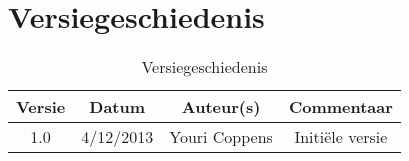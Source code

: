 \chapter{Versiegeschiedenis}

\begin{table}[htbp]
	\centering
	\begin{tabular} {|c|c|c|c|}
	    \hline
		\textbf{Versie} & \textbf{Datum} 	& \textbf{Auteur(s)} & \textbf{Commentaar} \\
		\hline
		1.0	& 4/12/2013	& Youri Coppens	& Initi\"{e}le versie \\ \hline
	\end{tabular}
	\caption{Versiegeschiedenis}
\end{table}
